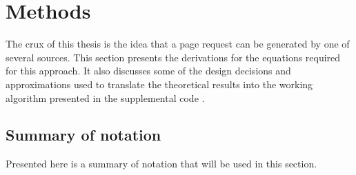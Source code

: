 \chapter{Methods}
\label{chapter:methods}

  The crux of this thesis is the idea that a page request can be generated by
  one of several sources. This section presents the derivations for the
  equations required for this approach. It also discusses some of the design
  decisions and approximations used to translate the theoretical results into
  the working algorithm presented in the supplemental code \cite{supplimental}.

\section{Summary of notation}
  Presented here is a summary of notation that will be used in this section.

